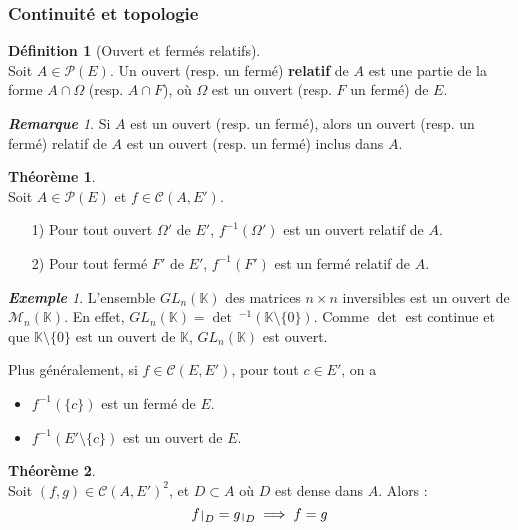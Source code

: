 \documentclass[12pt]{book}
\let\ensembleNombre\mathbb
\newcommand*\K{\ensuremath{\ensembleNombre{K}}}
\def\restriction#1#2{\mathchoice
				{\setbox1\hbox{${\displaystyle #1}_{\scriptstyle #2}$}
				\restrictionaux{#1}{#2}}
				{\setbox1\hbox{${\textstyle #1}_{\scriptstyle #2}$}
				\restrictionaux{#1}{#2}}
				{\setbox1\hbox{${\scriptstyle #1}_{\scriptscriptstyle #2}$}
				\restrictionaux{#1}{#2}}
				{\setbox1\hbox{${\scriptscriptstyle #1}_{\scriptscriptstyle #2}$}
				\restrictionaux{#1}{#2}}}
\def\restrictionaux#1#2{{#1\, \smash{\vrule height .8\ht1 depth .85\dp1}}_{\,#2}}
\theoremstyle{definition}
\newtheorem*{defi}{Définition}
\newtheorem{thme}{Théorème}[chapter]
\theoremstyle{remark}
\newtheorem*{rem}{\textbf{Remarque}}
\newtheorem*{ex}{\textbf{Exemple}}
\newenvironment{fdef}
  {\begin{mdframed}[roundcorner=10pt, linewidth=1pt]\begin{defi}}
  {\end{defi}\end{mdframed}}
\newenvironment{fthme}
  {\begin{mdframed}[roundcorner=10pt, linewidth=2pt]\begin{thme}}
  {\end{thme}\end{mdframed}}
\begin{document}
			\subsubsection{Continuité et topologie}
	\begin{fdef}[Ouvert et fermés relatifs]\mbox{~}\\
	Soit $A \in \mathcal P(E)$. Un ouvert (resp. un fermé) \textbf{relatif} de $A$ est une partie de la forme $A \cap \Omega$ (resp. $A \cap F$), où $\Omega$ est un ouvert (resp. $F$ un fermé) de $E$.
	\end{fdef}
	
	\begin{rem}
	Si $A$ est un ouvert (resp. un fermé), alors un ouvert (resp. un fermé) relatif de $A$ est un ouvert (resp. un fermé) inclus dans $A$.
	\end{rem}
	
	\begin{fthme}\mbox{~}\\
	Soit $A \in \mathcal P(E)$ et $f \in \mathcal C(A, E')$.
	\begin{itemize}
	\item[1)] Pour tout ouvert $\Omega'$ de $E'$, $f^{-1}(\Omega')$ est un ouvert relatif de $A$.
	\item[2)] Pour tout fermé $F'$ de $E'$, $f^{-1}(F')$ est un fermé relatif de $A$.
	\end{itemize}
	\end{fthme}
	
	\begin{ex}
	L'ensemble $GL_n(\K)$ des matrices $n\times n$ inversibles est un ouvert de $\mathcal M_n(\K)$. En effet, $GL_n(\K) = \det \!\!\!\!~^{-1}\left( \K \setminus \lbrace 0 \rbrace \right)$. Comme $\det$ est continue et que $\K \setminus \lbrace 0 \rbrace$ est un ouvert de $\K$, $GL_n(\K)$ est ouvert.
	
	Plus généralement, si $f \in \mathcal C(E,E')$, pour tout $c \in E'$, on a 
	\begin{itemize}
	\item $f^{-1}(\lbrace c \rbrace)$ est un fermé de $E$.
	\item $f^{-1}(E' \setminus \lbrace c \rbrace)$ est un ouvert de $E$.
	\end{itemize}
	\end{ex}
	
	\begin{fthme}\mbox{~}\\
	Soit $(f,g) \in \mathcal C(A,E')^2$, et $D \subset A$ où $D$ est dense dans $A$. Alors :
	\[ \restriction{f}{D} = \restriction{g}{D} \;\Longrightarrow\; f = g \]
	\end{fthme}
	
\end{document}

